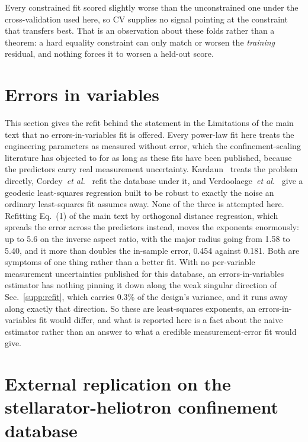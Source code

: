 \documentclass[12pt,letterpaper]{article}
\begin{document}
Every
constrained fit scored slightly worse than the unconstrained one under the
cross-validation used here, so CV supplies no signal pointing at the constraint
that transfers best. That is an observation about these folds rather than a
theorem: a hard equality constraint can only match or worsen the \emph{training}
residual, and nothing forces it to worsen a held-out score.

\section{Errors in variables}
\label{supp:eiv}

This section gives the refit behind the statement in the Limitations of the
main text that no errors-in-variables fit is offered. Every power-law fit here
treats the engineering parameters as measured without error, which the
confinement-scaling literature has objected to for as long as these fits have
been published, because the predictors carry real measurement uncertainty. Kardaun~\cite{kardaun} treats the problem directly,
Cordey~\emph{et al.}~\cite{cordey} refit the database under it, and
Verdoolaege~\emph{et al.}~\cite{gls} give a geodesic least-squares regression
built to be robust to exactly the noise an ordinary least-squares fit assumes
away. None of the three is attempted here. Refitting Eq.~(1) of the main text by
orthogonal distance regression, which spreads the error across the predictors
instead, moves the exponents enormously: up to 5.6 on the inverse aspect ratio,
with the major radius going from 1.58 to 5.40, and it more than doubles the
in-sample error, 0.454 against 0.181. Both are symptoms of one thing rather than
a better fit. With no per-variable measurement uncertainties published for this
database, an errors-in-variables estimator has nothing pinning it down along the
weak singular direction of Sec.~\ref{supp:refit}, which carries 0.3\% of the
design's variance, and it runs away along exactly that direction. So these are
least-squares exponents, an errors-in-variables fit would differ, and what is
reported here is a fact about the naive estimator rather than an answer to what
a credible measurement-error fit would give.

\section{External replication on the stellarator-heliotron confinement database}
\label{sec:ishcdb}
\end{document}
